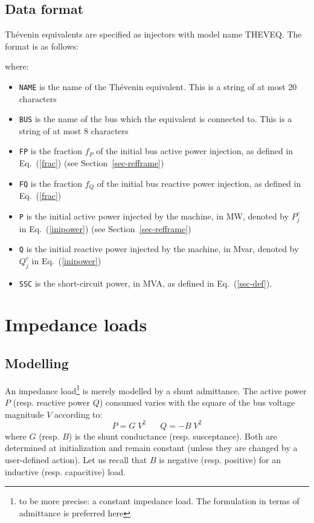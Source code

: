 \subsection{Data format}\label{format-thev}

Th\'{e}venin equivalents are specified as injectors with model name THEVEQ. The format is as follows:

\hspace*{5ex}{\tt INJEC THEVEQ NAME BUS FP FQ P Q SSC ;}

where:
\begin{itemize}
\item {\tt NAME} is the name of the Th\'{e}venin equivalent. This is a string of at most 20 characters
\item {\tt BUS} is the name of the bus which the equivalent is connected to. This is a string of at most 8 characters
\item {\tt FP} is the fraction $f_P$ of the initial bus active power injection, as defined in Eq.~(\ref{frac}) (see Section~\ref{sec-refframe})
\item {\tt FQ} is the fraction $f_Q$ of the initial bus reactive power injection, as defined in Eq.~(\ref{frac})
\item {\tt P} is the initial active power injected by the machine, in MW, denoted by $P^c_j$ in Eq.~(\ref{inipower}) (see Section~\ref{sec-refframe})
\item {\tt Q} is the initial reactive power injected by the machine, in Mvar, denoted by $Q^c_j$ in Eq.~(\ref{inipower})
\item {\tt SSC} is the short-circuit power, in MVA, as defined in Eq.~(\ref{ssc-def}).
\end{itemize}

\section{Impedance loads}

\subsection{Modelling}

An impedance load\footnote{to be more precise: a constant impedance load. The formulation in terms of admittance is preferred here} is merely modelled by a shunt admittance. The active power $P$ (resp. reactive power $Q$) consumed varies with the square of the bus voltage magnitude $V$ according to:
\begin{equation}\label{impload-pq}
P = G \; V^2 \;\;\;\;\;\; Q = - B \; V^2
\end{equation}
where $G$ (resp. $B$) is the shunt conductance (resp. susceptance). Both are determined at initialization and remain constant (unless they are changed by a user-defined action). Let us recall that $B$ is negative (resp. positive) for an inductive (resp. capacitive) load.

